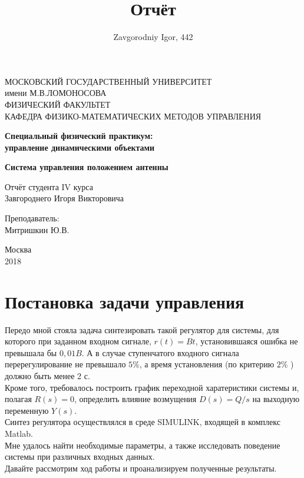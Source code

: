 \documentclass[12pt, a4paper]{report}
\author{Zavgorodniy Igor, 442}
\title{Отчёт}
\date{}
\theoremstyle{definition}
\theoremstyle{plain}
\theoremstyle{remark}
\theoremstyle{remark}
\theoremstyle{definition}
\begin{document}
\begin{titlepage}
  \begin{center}
    \large
    МОСКОВСКИЙ ГОСУДАРСТВЕННЫЙ УНИВЕРСИТЕТ\\ имени М.В.ЛОМОНОСОВА\\
    ФИЗИЧЕСКИЙ ФАКУЛЬТЕТ\\КАФЕДРА ФИЗИКО-МАТЕМАТИЧЕСКИХ МЕТОДОВ УПРАВЛЕНИЯ

	\underline{\hspace{12cm}}

    \vfill

    {\LARGE \textbf{Специальный физический практикум:
 \\ управление динамическими объектами}}
  	\bigskip
  	
    {\textbf{Система управления положением антенны}}  	
  	\bigskip


    Отчёт студента IV курса\\
    Завгороднего Игоря Викторовича
\end{center}
\vfill

\begin{flushright}
Преподаватель:\\
Митришкин Ю.В.
\end{flushright}
\vfill

\begin{center}
  Москва\\2018
\end{center}
\end{titlepage}

\newpage
\tableofcontents


\newpage
\section{Постановка задачи управления}
Передо мной стояла задача синтезировать такой регулятор для системы, для которого при заданном входном сигнале, $r(t)=Bt$, установившаяся ошибка не превышала бы $0,01B$. А в случае ступенчатого входного сигнала перерегулирование не превышало $5\%$, а время установления (по критерию $2\%$ ) должно быть менее 2 с. \\
Кроме того, требовалось построить график переходной харатеристики системы и, полагая $R(s)=0$, определить влияние возмущения $D(s)=Q/s$  на выходную переменную $Y(s)$.\\
Синтез регулятора осуществлялся в среде SIMULINK, входящей в комплекс Matlab.\\
Мне удалось найти необходимые параметры, а также исследовать поведение системы при различных входных данных.\\
Давайте рассмотрим ход работы и проанализируем полученные результаты.
\end{document}
